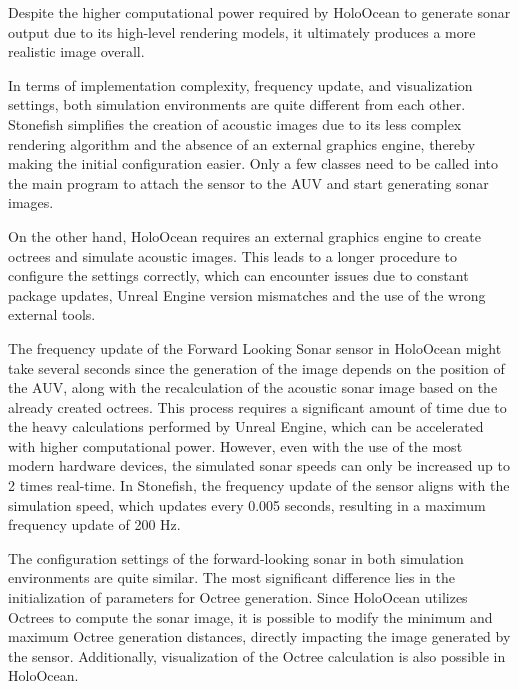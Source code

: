 \documentclass[]{article}
\begin{document}
	Despite the higher computational power required by HoloOcean to generate sonar output due to its high-level rendering models, it ultimately produces a more realistic image overall.
	
	In terms of implementation complexity, frequency update, and visualization settings, both simulation environments are quite different from each other. Stonefish simplifies the creation of acoustic images due to its less complex rendering algorithm and the absence of an external graphics engine, thereby making the initial configuration easier. Only a few classes need to be called into the main program to attach the sensor to the AUV and start generating sonar images.
	
	On the other hand, HoloOcean requires an external graphics engine to create octrees and simulate acoustic images. This leads to a longer procedure to configure the settings correctly, which can encounter issues due to constant package updates, Unreal Engine version mismatches and the use of the wrong external tools. 
	
	The frequency update of the Forward Looking Sonar sensor in HoloOcean might take several seconds since the generation of the image depends on the position of the AUV, along with the recalculation of the acoustic sonar image based on the already created octrees. This process requires a significant amount of time due to the heavy calculations performed by Unreal Engine, which can be accelerated with higher computational power. However, even with the use of the most modern hardware devices, the simulated sonar speeds can only be increased up to 2 times real-time. In Stonefish, the frequency update of the sensor aligns with the simulation speed, which updates every 0.005 seconds, resulting in a maximum frequency update of 200 Hz.
	
	The configuration settings of the forward-looking sonar in both simulation environments are quite similar. The most significant difference lies in the initialization of parameters for Octree generation. Since HoloOcean utilizes Octrees to compute the sonar image, it is possible to modify the minimum and maximum Octree generation distances, directly impacting the image generated by the sensor. Additionally, visualization of the Octree calculation is also possible in HoloOcean.
	
\end{document}
